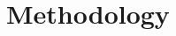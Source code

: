 \documentclass[11pt,letterpaper]{article}
\begin{document}
\section{Methodology}\label{sec:methodology}
%
%
%
%
%
%
%
%
%
\end{document}
